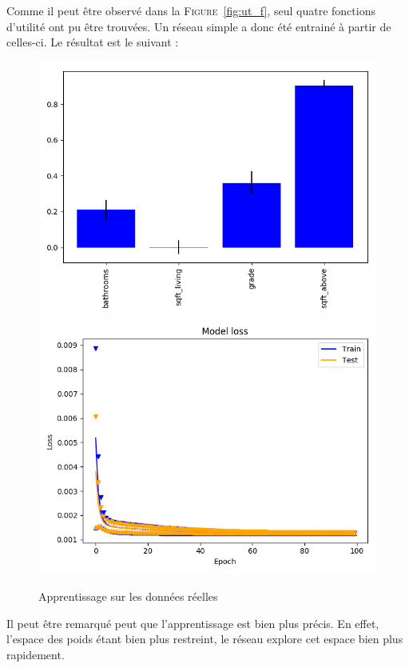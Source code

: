 Comme il peut être observé dans la \textsc{Figure}\ \ref{fig:ut_f}, seul quatre fonctions d'utilité ont pu être trouvées.
Un réseau simple a donc été entrainé à partir de celles-ci.
Le résultat est le suivant :
\begin{figure}[H]
    \center
    \includegraphics[width=0.49\columnwidth]{pict/real/ut/res.png}
    \includegraphics[width=0.49\columnwidth]{pict/real/ut/learn.png}
	\caption{Apprentissage sur les données réelles}
	\label{fig:ut1_100_100}
\end{figure}


Il peut être remarqué peut que l'apprentissage est bien plus précis.
En effet, l'espace des poids étant bien plus restreint,
le réseau explore cet espace bien plus rapidement.


